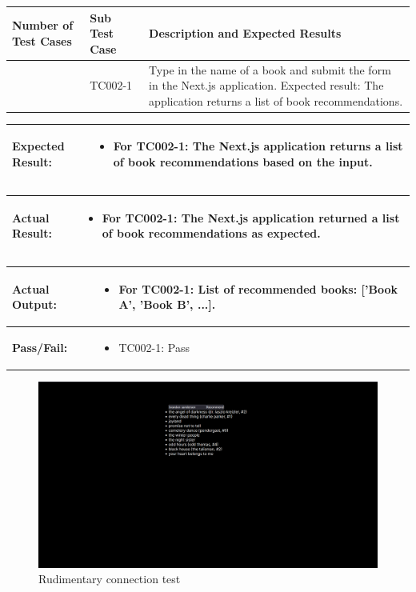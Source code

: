 \noindent
\begin{tabularx}{\textwidth}{|>{\centering\arraybackslash}p{3cm}|>{\centering\arraybackslash}p{3cm}|X|}
    \hline
    \textbf{Number of Test Cases} & \textbf{Sub Test Case} & \textbf{Description and Expected Results} \\ \hline
    1 & TC002-1 & Type in the name of a book and submit the form in the Next.js application. Expected result: The application returns a list of book recommendations. \\ \hline
\end{tabularx}

\noindent
\begin{tabularx}{\textwidth}{|>{\raggedright\arraybackslash}p{4cm}|X|}
    \hline
    \textbf{Expected Result:} & 
    \begin{itemize}
        \item For TC002-1: The Next.js application returns a list of book recommendations based on the input.
    \end{itemize}
    \\ \hline
\end{tabularx}

\noindent
\begin{tabularx}{\textwidth}{|>{\raggedright\arraybackslash}p{4cm}|X|}
    \hline
    \textbf{Actual Result:} & 
    \begin{itemize}
        \item For TC002-1: The Next.js application returned a list of book recommendations as expected.
    \end{itemize}
    \\ \hline
\end{tabularx}

\noindent
\begin{tabularx}{\textwidth}{|>{\raggedright\arraybackslash}p{4cm}|X|}
    \hline
    \textbf{Actual Output:} & 
    \begin{itemize}
        \item For TC002-1: List of recommended books: ['Book A', 'Book B', ...].
    \end{itemize}
    \\ \hline
    \textbf{Pass/Fail:} & 
    \begin{itemize}
        \item TC002-1: Pass
    \end{itemize}
    \\ \hline
\end{tabularx}

\begin{figure}[htbp]
    \centering
    \includegraphics[width=1\textwidth]{../../assets/rudimentary_api_functionality.png}
    \caption{Rudimentary connection test}
    \label{fig:test2testApp}
\end{figure}
